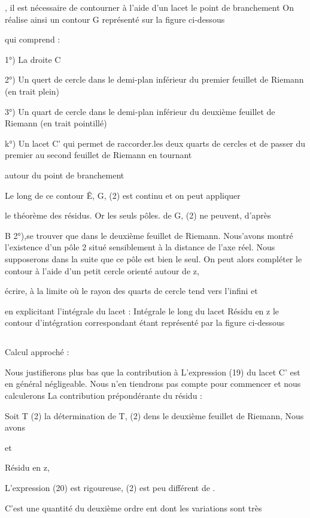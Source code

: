  , il est nécessaire de contourner à l'aide d'un lacet le point de branchement On réalise ainsi un contour G représenté sur la figure ci-dessous

qui comprend :

1°) La droite C

2°) Un quert de cercle dans le demi-plan inférieur du premier
feuillet de Riemann (en trait plein)

3°) Un quart de cercle dans le demi-plan inférieur du deuxième
feuillet de Riemann (en trait pointillé)

k°) Un lacet C' qui permet de raccorder.les deux quarts de
cercles et de passer du premier au second feuillet de Riemann en tournant

autour du point de branchement

Le long de ce contour Ê, G, (2) est continu et on peut appliquer

le théorème des résidus. Or les seuls pôles. de G, (2) ne peuvent, d'après

 B 2°),se trouver que dans le deuxième feuillet de Riemann. Nous’avons montré
l'existence d'un pôle 2 situé sensiblement à la distance de l'axe réel.
Nous supposerons dans la suite que ce pôle est bien le seul. On peut alors compléter le contour  à l'aide d'un petit cercle orienté autour de z,

écrire, à la limite où le rayon des quarts de cercle tend vers l'infini et

en explicitant l'intégrale du lacet :
Intégrale le long du lacet
Résidu en z
le contour d'intégration correspondant étant représenté par la figure ci-dessous
\subsection{} Calcul approché :%

Nous justifierons plus bas que la contribution à L'expression (19) du lacet C' est en général négligeable. Nous n'en tiendrons pas
compte pour commencer et nous calculerons La contribution prépondérante du
résidu :

Soit T (2) la détermination de T, (2) dens le deuxième feuillet
de Riemann, Nous avons


et

Résidu en z,

L'expression (20) est rigoureuse, (2) est peu différent de .

C'est une quantité du deuxième ordre ent dont les variations sont très

